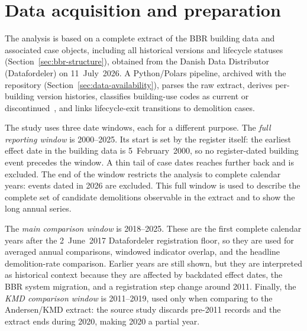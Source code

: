 \section{Data acquisition and preparation}\label{sec:data}

The analysis is based on a complete extract of the BBR building data
and associated case objects, including all historical versions and
lifecycle statuses (Section~\ref{sec:bbr-structure}), obtained from the
Danish Data Distributor (Datafordeler) on 11~July~2026. A Python/Polars
pipeline, archived with the repository
(Section~\ref{sec:data-availability}), parses the raw extract, derives
per-building version histories, classifies building-use codes as
current or discontinued~\cite{bbr_kodelister}, and links lifecycle-exit
transitions to demolition cases.

The study uses three date windows, each for a different purpose. The
\emph{full reporting window} is 2000--2025. Its start is set by the
register itself: the earliest effect date in the building data is
5~February~2000, so no register-dated building event precedes the
window. A thin tail of case dates reaches further back and is excluded.
The end of the window restricts the analysis to complete calendar years:
events dated in 2026 are excluded. This full window is used to describe
the complete set of candidate demolitions observable in the extract and
to show the long annual series.

The \emph{main comparison window} is 2018--2025. These are the first
complete calendar years after the 2~June~2017 Datafordeler registration
floor, so they are used for averaged annual comparisons, windowed
indicator overlap, and the headline demolition-rate comparison. Earlier
years are still shown, but they are interpreted as historical context
because they are affected by backdated effect dates, the BBR system
migration, and a registration step change around 2011. Finally, the
\emph{KMD comparison window} is 2011--2019, used only when comparing to
the Andersen/KMD extract: the source study discards pre-2011 records and
the extract ends during 2020, making 2020 a partial year.

